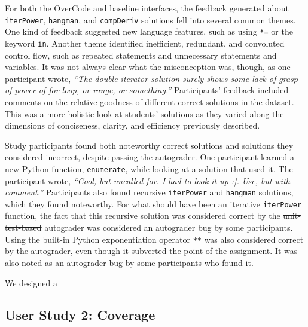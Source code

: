 \documentclass[12pt,twoside]{mitthesis}
\newcommand \codevar[1]{\texttt{#1}}
\providecommand{\DIFaddtex}[1]{{\protect\color{blue}\uwave{#1}}} %
\providecommand{\DIFdeltex}[1]{{\protect\color{red}\sout{#1}}}                      %
\providecommand{\DIFaddbegin}{} %
\providecommand{\DIFaddend}{} %
\providecommand{\DIFdelbegin}{} %
\providecommand{\DIFdelend}{} %
\providecommand{\DIFadd}[1]{\texorpdfstring{\DIFaddtex{#1}}{#1}} %
\providecommand{\DIFdel}[1]{\texorpdfstring{\DIFdeltex{#1}}{}} %
\begin{document}
{{{{{{{{{{For both the OverCode and baseline interfaces, the feedback generated about \codevar{iterPower}, \codevar{hangman}, and \codevar{compDeriv} solutions fell into several common themes. One kind of feedback suggested new language features, such as using \codevar{*=} or the keyword \codevar{in}. Another theme identified inefficient, redundant, and convoluted control flow, such as repeated statements and unnecessary statements and variables. It was not always clear what the misconception was, though, as one participant wrote, \textit{``The double iterator solution surely shows some lack of grasp of power of for loop, or range, or something.''} \DIFdelbegin \DIFdel{Participants' }\DIFdelend \DIFaddbegin \DIFadd{Participant }\DIFaddend feedback included comments on the relative goodness of different correct solutions in the dataset. This was a more holistic look at \DIFdelbegin \DIFdel{students' }\DIFdelend \DIFaddbegin \DIFadd{student }\DIFaddend solutions as they varied along the dimensions of conciseness, clarity, and efficiency previously described.

Study participants found both noteworthy correct solutions and solutions they considered incorrect, despite passing the autograder. One participant learned a new Python function, \codevar{enumerate}, while looking at a solution that used it. The participant wrote, \textit{``Cool, but uncalled for. I had to look it up :]. Use, but with comment.''} Participants also found recursive \codevar{iterPower} and \codevar{hangman} solutions, which they found noteworthy. For what should have been an iterative \codevar{iterPower} function, the fact that this recursive solution was considered correct by the \DIFdelbegin \DIFdel{unit-test-based }\DIFdelend autograder was considered an autograder bug by some participants. Using the built-in Python exponentiation operator \codevar{**} was also considered correct by the autograder, even though it subverted the point of the assignment. It was also noted as an autograder bug by some participants who found it.
\DIFdelbegin %
\DIFdelend 

\DIFdelbegin \DIFdel{We designed a }\DIFdelend \DIFaddbegin \subsection{User Study 2: Coverage}

}}}}}}}}}}
\end{document}
